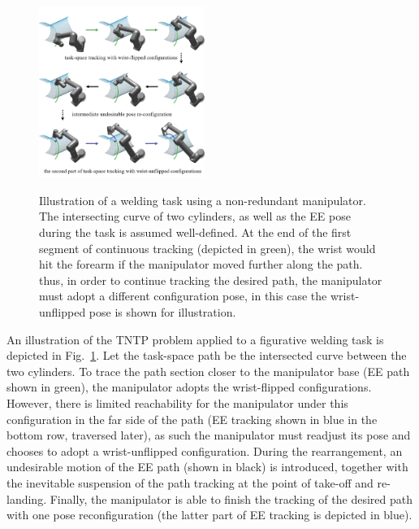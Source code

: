 \documentclass[letterpaper, 10 pt, conference]{ieeeconf}  %
\begin{document}
\begin{figure}[t]
\centering
\includegraphics[width=0.48\textwidth]{figures/fig1/fig1_2}\label{fig:zerosolution}
\caption{Illustration of a welding task using a non-redundant manipulator. The intersecting curve of two cylinders, as well as the EE pose during the task is assumed well-defined. 
At the end of the first segment of continuous tracking (depicted in green), the wrist would hit the forearm if the manipulator moved further along the path. thus, in order to continue tracking the desired path, the manipulator must adopt a different configuration pose, in this case the wrist-unflipped pose is shown for illustration.}
\label{fig:demo1}
\end{figure}


An illustration of the TNTP problem applied to a figurative welding task is depicted in Fig.~\ref{fig:demo1}. Let the task-space path be the intersected curve between the two cylinders. 
To trace the path section closer to the manipulator base (EE path shown in green), the manipulator adopts the wrist-flipped configurations. 
However, there is limited reachability for the manipulator under this configuration in the far side of the path (EE tracking shown in blue in the bottom row, traversed later), as such the manipulator must readjust its pose and chooses to adopt a wrist-unflipped configuration. During the rearrangement, an undesirable motion of the EE path (shown in black) is introduced, together with the inevitable suspension of the path tracking at the point of take-off and re-landing. 
Finally, the manipulator is able to finish the tracking of the desired path with one pose reconfiguration (the latter part of EE tracking is depicted in blue). 
\end{document}
